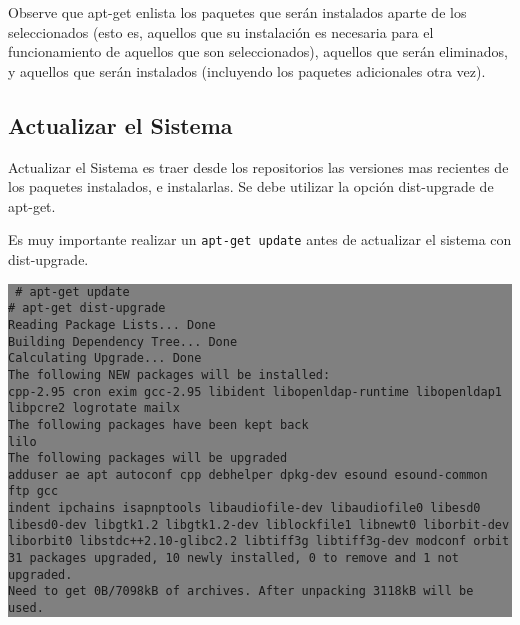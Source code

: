 \documentclass[12pt]{article}
\begin{document}
Observe que apt-get enlista los paquetes que serán instalados aparte de los seleccionados (esto es, aquellos que su instalación es necesaria para el funcionamiento de aquellos que son seleccionados), aquellos que serán eliminados, y aquellos que serán instalados (incluyendo los paquetes adicionales otra vez).

\subsection*{Actualizar el Sistema}

Actualizar el Sistema es traer desde los repositorios las versiones mas recientes de los paquetes instalados,
e instalarlas. Se debe utilizar la opción dist-upgrade de apt-get.

Es muy importante realizar un \texttt{apt-get update} antes de actualizar el sistema con dist-upgrade.

\colorbox{grey}{\parbox[t]{0.95\linewidth}{ \vspace*{0.5cm} {\tt
     \# apt-get update\\
     \# apt-get dist-upgrade\\
     Reading Package Lists... Done\\
     Building Dependency Tree... Done\\
     Calculating Upgrade... Done\\
     The following NEW packages will be installed:\\
       cpp-2.95 cron exim gcc-2.95 libident libopenldap-runtime libopenldap1\\
       libpcre2 logrotate mailx\\
     The following packages have been kept back\\
       lilo\\
     The following packages will be upgraded\\
       adduser ae apt autoconf cpp debhelper dpkg-dev esound esound-common ftp gcc\\
       indent ipchains isapnptools libaudiofile-dev libaudiofile0 libesd0\\
       libesd0-dev libgtk1.2 libgtk1.2-dev liblockfile1 libnewt0 liborbit-dev\\
       liborbit0 libstdc++2.10-glibc2.2 libtiff3g libtiff3g-dev modconf orbit\\
     31 packages upgraded, 10 newly installed, 0 to remove and 1 not upgraded.\\
     Need to get 0B/7098kB of archives. After unpacking 3118kB will be used.\\
 } \vspace*{0.5cm} } } 
\end{document}
